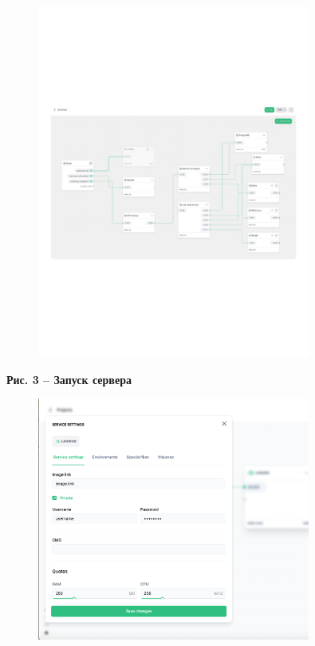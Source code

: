 {\begin{figure}[H]
	\centering
	\includegraphics[width=0.8\textwidth]{media/ict/image20}
	\caption*{}
\end{figure}


{\bfseries Рис. 3 -- Запуск сервера}

\begin{figure}[H]
	\centering
	\includegraphics[width=0.8\textwidth]{media/ict/image21}
	\caption*{}
\end{figure}


}
